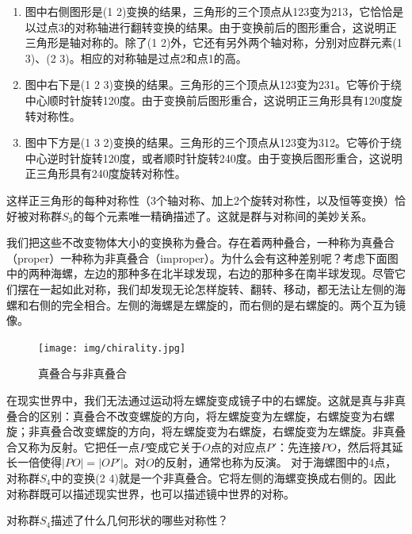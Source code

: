 \documentclass[b5paper]{ctexart}
\begin{document}
\begin{enumerate}
\item 图中右侧图形是(1 2)变换的结果，三角形的三个顶点从123变为213，它恰恰是以过点3的对称轴进行翻转变换的结果。由于变换前后的图形重合，这说明正三角形是轴对称的。除了(1 2)外，它还有另外两个轴对称，分别对应群元素(1 3)、(2 3)。相应的对称轴是过点2和点1的高。

\item 图中右下是(1 2 3)变换的结果。三角形的三个顶点从123变为231。它等价于绕中心顺时针旋转120度。由于变换前后图形重合，这说明正三角形具有120度旋转对称性。

\item 图中下方是(1 3 2)变换的结果。三角形的三个顶点从123变为312。它等价于绕中心逆时针旋转120度，或者顺时针旋转240度。由于变换后图形重合，这说明正三角形具有240度旋转对称性。
\end{enumerate}

这样正三角形的每种对称性（3个轴对称、加上2个旋转对称性，以及恒等变换）恰好被对称群$S_3$的每个元素唯一精确描述了。这就是群与对称间的美妙关系。

我们把这些不改变物体大小的变换称为叠合。存在着两种叠合，一种称为真叠合（proper）一种称为非真叠合（improper）。为什么会有这种差别呢？考虑下面图中的两种海螺，左边的那种多在北半球发现，右边的那种多在南半球发现。尽管它们摆在一起如此对称，我们却发现无论怎样旋转、翻转、移动，都无法让左侧的海螺和右侧的完全相合。左侧的海螺是左螺旋的，而右侧的是右螺旋的。两个互为镜像。

\begin{figure}[htbp]
 \centering
 \texttt{[image: img/chirality.jpg]}
 \caption{真叠合与非真叠合}
 \label{fig:chirality}
\end{figure}

在现实世界中，我们无法通过运动将左螺旋变成镜子中的右螺旋。这就是真与非真叠合的区别：真叠合不改变螺旋的方向，将左螺旋变为左螺旋，右螺旋变为右螺旋；非真叠合改变螺旋的方向，将左螺旋变为右螺旋，右螺旋变为左螺旋。非真叠合又称为反射\cite{Weyl1952}。它把任一点$P$变成它关于$O$点的对应点$P'$：先连接$PO$，然后将其延长一倍使得$|PO| = |OP'|$。对$O$的反射，通常也称为反演。
对于海螺图中的4点，对称群$S_4$中的变换(2 4)就是一个非真叠合。它将左侧的海螺变换成右侧的。因此对称群既可以描述现实世界，也可以描述镜中世界的对称。

\begin{Exercise}\label{ex:symmetry-and-group}
对称群$S_4$描述了什么几何形状的哪些对称性？
\end{Exercise}
\end{document}
